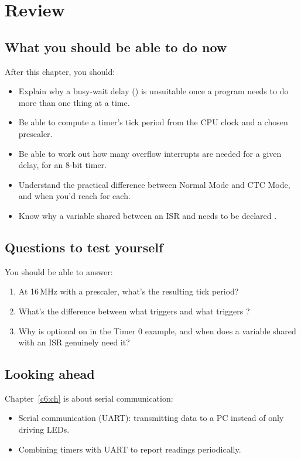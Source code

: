 
\section{Review}
\label{c5:sec:review}

\subsection*{What you should be able to do now}
After this chapter, you should:
\begin{itemize}
  \item Explain why a busy-wait delay () is unsuitable once a program needs to do
    more than one thing at a time.
  \item Be able to compute a timer's tick period from the CPU clock and a chosen prescaler.
  \item Be able to work out how many overflow interrupts are needed for a given delay, for an
    8-bit timer.
  \item Understand the practical difference between Normal Mode and CTC Mode, and when you'd reach
    for each.
  \item Know why a variable shared between an ISR and  needs to be declared
    .
\end{itemize}

\subsection*{Questions to test yourself}
You should be able to answer:
\begin{enumerate}
  \item At 16\,MHz with a  prescaler, what's the resulting tick period?
  \item What's the difference between what triggers  and what triggers
    ?
  \item Why is  optional on  in the Timer 0 example, and when does a
    variable shared with an ISR genuinely need it?
\end{enumerate}

\subsection*{Looking ahead}
Chapter~\ref{c6:ch} is about serial communication:
\begin{itemize}
  \item Serial communication (UART): transmitting data to a PC instead of only driving LEDs.
  \item Combining timers with UART to report readings periodically.
\end{itemize}
